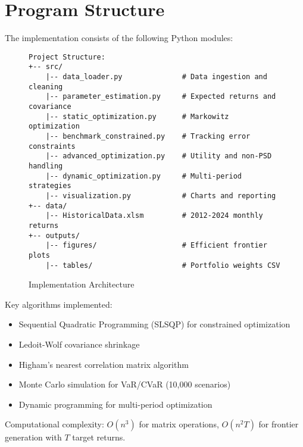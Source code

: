 \documentclass[12pt,a4paper]{article}
\begin{document}
\newpage
\appendix
\section{Program Structure}

The implementation consists of the following Python modules:

\begin{figure}[H]
\centering
\begin{verbatim}
Project Structure:
+-- src/
    |-- data_loader.py              # Data ingestion and cleaning
    |-- parameter_estimation.py     # Expected returns and covariance
    |-- static_optimization.py      # Markowitz optimization
    |-- benchmark_constrained.py    # Tracking error constraints
    |-- advanced_optimization.py    # Utility and non-PSD handling
    |-- dynamic_optimization.py     # Multi-period strategies
    |-- visualization.py            # Charts and reporting
+-- data/
    |-- HistoricalData.xlsm         # 2012-2024 monthly returns
+-- outputs/
    |-- figures/                    # Efficient frontier plots
    |-- tables/                     # Portfolio weights CSV
\end{verbatim}
\caption{Implementation Architecture}
\end{figure}

Key algorithms implemented:
\begin{itemize}
    \item Sequential Quadratic Programming (SLSQP) for constrained optimization
    \item Ledoit-Wolf covariance shrinkage
    \item Higham's nearest correlation matrix algorithm
    \item Monte Carlo simulation for VaR/CVaR (10,000 scenarios)
    \item Dynamic programming for multi-period optimization
\end{itemize}

Computational complexity: $O(n^3)$ for matrix operations, $O(n^2 T)$ for frontier generation with $T$ target returns.
\end{document}
